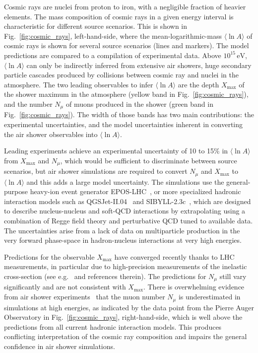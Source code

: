 \documentclass[../report.tex]{subfiles}
\newcommand{\mlna}{\langle \ln\!A \rangle}
\newcommand{\nmu}{N_\mu}
\newcommand{\xmax}{X_\text{max}}
\newcommand{\si}[1]{\ensuremath{\text{#1}}}
\begin{document}
Cosmic rays are nuclei from proton to iron, with a negligible fraction of heavier elements. The mass composition of cosmic rays in a given energy interval is characteristic for different source scenarios. This is shown in Fig.~\ref{fig:cosmic_rays}, left-hand-side, where the mean-logarithmic-mass $\mlna$ of cosmic rays is shown for several source scenarios (lines and markers). The model predictions are compared to a compilation of experimental data. Above $10^{15}$\,\si{eV}, $\mlna$ can only be indirectly inferred from extensive air showers, huge secondary particle cascades produced by collisions between cosmic ray and nuclei in the atmosphere. The two leading observables to infer $\mlna$ are the depth $\xmax$ of the shower maximum in the atmosphere (yellow band in Fig.~\ref{fig:cosmic_rays}), and the number $\nmu$ of muons produced in the shower (green band in Fig.~\ref{fig:cosmic_rays}). The width of those bands has two main contributions: the experimental uncertainties, and the model uncertainties inherent in converting the air shower observables into $\mlna$.

Leading experiments achieve an experimental uncertainty of 10 to 15\% in $\mlna$ from $\xmax$ and $\nmu$, which would be sufficient to discriminate between source scenarios, but air shower simulations are required to convert $\nmu$ and $\xmax$ to $\mlna$ and this adds a large model uncertainty. The simulations use the general-purpose heavy-ion event generator EPOS-LHC~\cite{Werner:2005jf}, or more specialized hadronic interaction models such as \mbox{QGSJet-II.04}~\cite{Ostapchenko:2010vb} and SIBYLL-2.3c~\cite{Riehn:2017mfm}, which are designed to describe nucleus-nucleus and soft-QCD interactions by extrapolating using a combination of Regge field theory and perturbative QCD tuned to available data.
The uncertainties arise from a lack of data on multiparticle production in the very forward phase-space in hadron-nucleus interactions at very high energies.

Predictions for the observable $\xmax$ have converged recently thanks to LHC measurements, in particular due to high-precision measurements of the inelastic cross-section (see e.g.~\cite{Aaij:2018okq} and references therein). The predictions for $\nmu$ still vary significantly and are not consistent with $\xmax$. There is overwhelming evidence from air shower experiments~\cite{Aab:2014pza,Dembinski:2017zkb,Kokoulin:2009zz,AbuZayyad:1999xa,Aab:2014dua} that the muon number $\nmu$ is underestimated in simulations at high energies, as indicated by the data point from the Pierre Auger Observatory in Fig.~\ref{fig:cosmic_rays}, right-hand-side, which is well above the predictions from all current hadronic interaction models. This produces conflicting interpretation of the cosmic ray composition and impairs the general confidence in air shower simulations.
\end{document}
